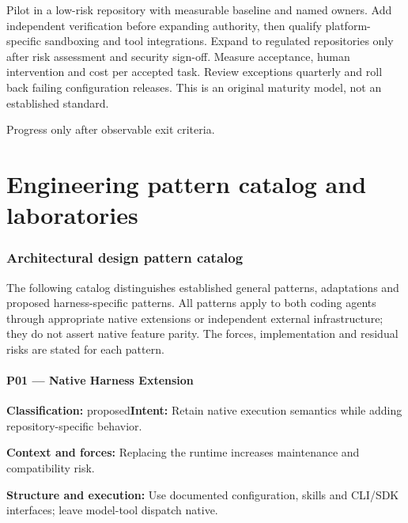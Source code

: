 \documentclass[11pt,letterpaper]{article}
\begin{document}
Pilot in a low-risk repository with measurable baseline and named owners. Add independent verification before expanding authority, then qualify platform-specific sandboxing and tool integrations. Expand to regulated repositories only after risk assessment and security sign-off. Measure acceptance, human intervention and cost per accepted task. Review exceptions quarterly and roll back failing configuration releases. This is an original maturity model, not an established standard.

\begin{center}\begin{minipage}{\linewidth}\captionsetup{type=figure}\centering{}\caption{Enterprise adoption maturity model}
\small Progress only after observable exit criteria.\end{minipage}\end{center}
\clearpage\part{Engineering pattern catalog and laboratories}\section{Architectural design pattern catalog}
The following catalog distinguishes established general patterns, adaptations and proposed harness-specific patterns. All patterns apply to both coding agents through appropriate native extensions or independent external infrastructure; they do not assert native feature parity. The forces, implementation and residual risks are stated for each pattern.
\subsection*{P01 --- Native Harness Extension}
\textbf{Classification:} proposed\quad\textbf{Intent:} Retain native execution semantics while adding repository-specific behavior.

\textbf{Context and forces:} Replacing the runtime increases maintenance and compatibility risk.

\textbf{Structure and execution:} Use documented configuration, skills and CLI/SDK interfaces; leave model-tool dispatch native.
\end{document}
